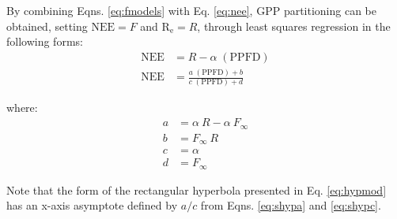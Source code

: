 By combining Eqns. \ref{eq:fmodels} with Eq. \ref{eq:nee}, GPP partitioning can be obtained, setting $\text{NEE} = F$ and $\text{R}_{\text{e}} = R$, through least squares regression in the following forms:
\begin{subequations}
\label{eq:neemodels}
\begin{align}
    \text{NEE} &= R - \alpha\; (\text{PPFD}) \label{eq:linmod}\\
    \text{NEE} &= \frac{a\; (\text{PPFD}) + b}
                       {c\; (\text{PPFD}) + d}\label{eq:hypmod}
\end{align}
\end{subequations}

\noindent where:
\begin{subequations}
\label{eq:shyp}
\begin{align}
    a&= \alpha\: R - \alpha\: F_{\infty} \label{eq:shypa}\\
    b&= F_{\infty}\: R \label{eq:shypb}\\
    c&= \alpha \label{eq:shypc}\\
    d&= F_{\infty} \label{eq:shypd}
\end{align}
\end{subequations}

\noindent Note that the form of the rectangular hyperbola presented in Eq. \ref{eq:hypmod} has an x-axis asymptote defined by $a/c$ from Eqns. \ref{eq:shypa} and \ref{eq:shypc}. 


